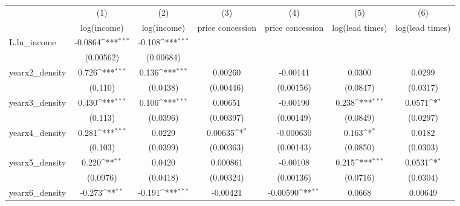 {
\def\sym#1{\ifmmode^{#1}\else\(^{#1}\)\fi}
\begin{tabular}{l*{6}{c}}
\toprule
            &\multicolumn{1}{c}{(1)}&\multicolumn{1}{c}{(2)}&\multicolumn{1}{c}{(3)}&\multicolumn{1}{c}{(4)}&\multicolumn{1}{c}{(5)}&\multicolumn{1}{c}{(6)}\\
            &\multicolumn{1}{c}{log(income)}&\multicolumn{1}{c}{log(income)}&\multicolumn{1}{c}{price concession}&\multicolumn{1}{c}{price concession}&\multicolumn{1}{c}{log(lead times)}&\multicolumn{1}{c}{log(lead times)}\\
\midrule
L.ln\_income &     -0.0864\sym{***}&      -0.108\sym{***}&                     &                     &                     &                     \\
            &   (0.00562)         &   (0.00684)         &                     &                     &                     &                     \\
\addlinespace
yearx2\_density&       0.726\sym{***}&       0.136\sym{***}&     0.00260         &    -0.00141         &      0.0300         &      0.0299         \\
            &     (0.110)         &    (0.0438)         &   (0.00446)         &   (0.00156)         &    (0.0847)         &    (0.0317)         \\
\addlinespace
yearx3\_density&       0.430\sym{***}&       0.106\sym{***}&     0.00651         &    -0.00190         &       0.238\sym{***}&      0.0571\sym{*}  \\
            &     (0.113)         &    (0.0396)         &   (0.00397)         &   (0.00149)         &    (0.0849)         &    (0.0297)         \\
\addlinespace
yearx4\_density&       0.281\sym{***}&      0.0229         &     0.00635\sym{*}  &   -0.000630         &       0.163\sym{*}  &      0.0182         \\
            &     (0.103)         &    (0.0399)         &   (0.00363)         &   (0.00143)         &    (0.0850)         &    (0.0303)         \\
\addlinespace
yearx5\_density&       0.220\sym{**} &      0.0420         &    0.000861         &    -0.00108         &       0.215\sym{***}&      0.0531\sym{*}  \\
            &    (0.0976)         &    (0.0418)         &   (0.00324)         &   (0.00136)         &    (0.0716)         &    (0.0304)         \\
\addlinespace
yearx6\_density&      -0.273\sym{**} &      -0.191\sym{***}&    -0.00421         &    -0.00590\sym{**} &      0.0668         &     0.00649         \\

\end{tabular}}
